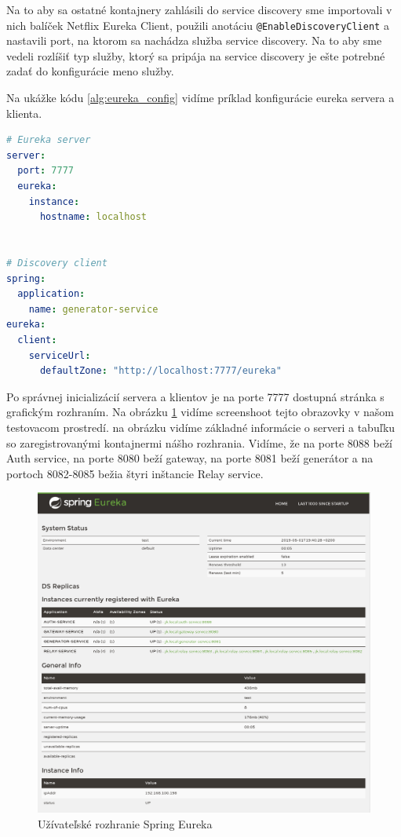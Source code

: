 Na to aby sa ostatné kontajnery zahlásili do service discovery sme importovali v nich balíček Netflix Eureka Client, použili anotáciu \texttt{@EnableDiscoveryClient} a nastavili port, na ktorom sa nachádza služba service discovery. Na to aby sme vedeli rozlíšiť typ služby, ktorý sa pripája na service discovery je ešte potrebné zadať do konfigurácie meno služby.

Na ukážke kódu \ref{alg:eureka_config} vidíme príklad konfigurácie eureka servera a klienta.

\begin{lstlisting}[float, caption={Konfigurácia Eureka servera a klienta},label={alg:eureka_config},language=yaml]
# Eureka server
server:
  port: 7777
  eureka:
	instance:
	  hostname: localhost
			

# Discovery client	
spring:
  application:
	name: generator-service
eureka:
  client:
	serviceUrl:
	  defaultZone: "http://localhost:7777/eureka"
\end{lstlisting}

Po správnej inicializácií servera a klientov je na porte 7777 dostupná stránka s grafickým rozhraním. Na obrázku \ref{eureka_gui} vidíme screenshoot tejto obrazovky v našom testovacom prostredí. na obrázku vidíme základné informácie o serveri a tabuľku so zaregistrovanými kontajnermi nášho rozhrania. Vidíme, že na porte 8088 beží Auth service, na porte 8080 beží gateway, na porte 8081 beží generátor a na portoch 8082-8085 bežia štyri inštancie Relay service.

\begin{figure}[!htbp]
	\centering
	\includegraphics[width=16cm]{img/eureka_gui.png}
	\caption{Užívateľské rozhranie Spring Eureka}
	\label{eureka_gui}
\end{figure}

